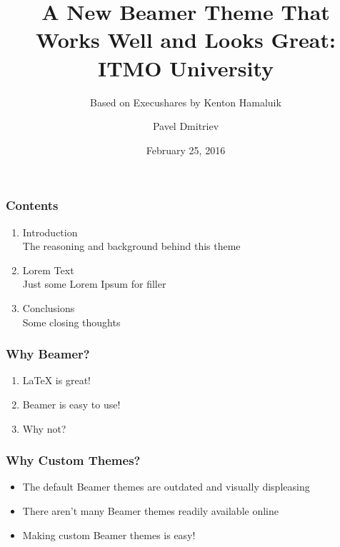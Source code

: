 \documentclass{beamer}
\title{A New Beamer Theme That Works Well and Looks Great: ITMO University}
\subtitle{Based on Execushares by Kenton Hamaluik}
\author{Pavel Dmitriev}
\date{February 25, 2016}
\begin{document}
	\setcounter{showProgressBar}{0}
	\setcounter{showSlideNumbers}{0}


	\begin{frame}
		\frametitle{Contents}
		\begin{enumerate}
			\item Introduction \\ \textcolor{StyleGrey}{\footnotesize\hspace{1em} The reasoning and background behind this theme}
			\item Lorem Text  \\ \textcolor{StyleGrey}{\footnotesize\hspace{1em} Just some Lorem Ipsum for filler}
			\item Conclusions \\ \textcolor{StyleGrey}{\footnotesize\hspace{1em} Some closing thoughts}
		\end{enumerate}
	\end{frame}
	
	\setcounter{framenumber}{0}
	\setcounter{showProgressBar}{1}
	\setcounter{showSlideNumbers}{1}
		\begin{frame}
			\frametitle{Why Beamer?}
			\begin{enumerate}
				\item LaTeX is great!
				\item Beamer is easy to use!
				\item Why not?
			\end{enumerate}
		\end{frame}

		\begin{frame}
			\frametitle{Why Custom Themes?}
			\begin{itemize}
				\item The default Beamer themes are outdated and visually displeasing
				\item There aren't many Beamer themes readily available online
				\item Making custom Beamer themes is easy!
			\end{itemize}
		\end{frame}
\end{document}
